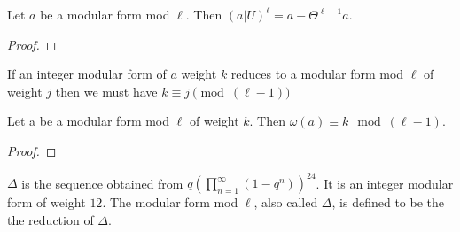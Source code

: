 \begin{theorem}
  \label{thm:UOp_pow_l}
  \leanok
  Let $a$ be a modular form mod $\ell$. Then $(a|U) ^ \ell = a - \Theta^{\ell - 1} a$.
\end{theorem}
\begin{proof}
  \leanok
\end{proof}




\begin{theorem}
  \label{thm:Reduce_of_reduce}
  \leanok

  If an integer modular form of $a$ weight $k$ reduces to a modular form mod $\ell$ of weight $j$ 
  then we must have $k \equiv j \pmod (\ell - 1)$

\end{theorem}

\begin{theorem}
  \label{thm:Filtration_congruence}
  \leanok
  Let a be a modular form mod $\ell$ of weight $k$. Then 
  $\omega (a) \equiv k \mod (\ell - 1)$. 
\end{theorem}
\begin{proof}
  \leanok
\end{proof}


\begin{definition}[Delta]
  \label{def:Delta}
  
  $\Delta$ is the sequence obtained from $q (\prod_{n = 1}^{\infty} (1 - q^n))^{24}$.
  It is an integer modular form of weight $12$. The modular form mod $\ell$, also called 
  $\Delta$, is defined to be the the reduction of $\Delta$.
\end{definition}

